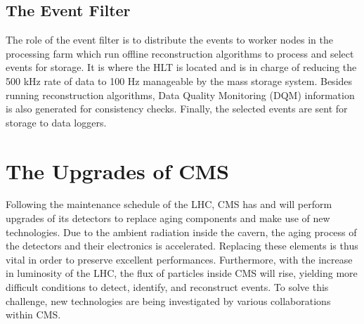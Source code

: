     \subsection{The Event Filter}

      The role of the event filter is to distribute the events to worker nodes in the processing farm which run offline reconstruction algorithms to process and select events for storage. It is where the HLT is located and is in charge of reducing the 500 kHz rate of data to 100 Hz manageable by the mass storage system. Besides running reconstruction algorithms, Data Quality Monitoring (DQM) information is also generated for consistency checks. Finally, the selected events are sent for storage to data loggers.

  \section{The Upgrades of CMS}

    Following the maintenance schedule of the LHC, CMS has and will perform upgrades of its detectors to replace aging components and make use of new technologies. Due to the ambient radiation inside the cavern, the aging process of the detectors and their electronics is accelerated. Replacing these elements is thus vital in order to preserve excellent performances. Furthermore, with the increase in luminosity of the LHC, the flux of particles inside CMS will rise, yielding more difficult conditions to detect, identify, and reconstruct events. To solve this challenge, new technologies are being investigated by various collaborations within CMS.
